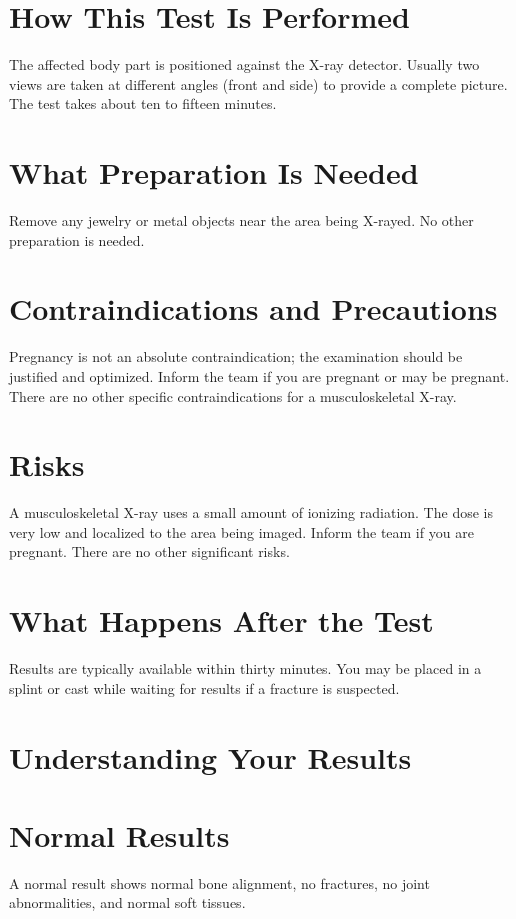 \section*{How This Test Is Performed}
The affected body part is positioned against the X-ray detector. Usually two views are taken at different angles (front and side) to provide a complete picture. The test takes about ten to fifteen minutes.

\section*{What Preparation Is Needed}
Remove any jewelry or metal objects near the area being X-rayed. No other preparation is needed.

\section*{Contraindications and Precautions}
Pregnancy is not an absolute contraindication; the examination should be justified and optimized. Inform the team if you are pregnant or may be pregnant. There are no other specific contraindications for a musculoskeletal X-ray.

\section*{Risks}
A musculoskeletal X-ray uses a small amount of ionizing radiation. The dose is very low and localized to the area being imaged. Inform the team if you are pregnant. There are no other significant risks.

\section*{What Happens After the Test}
Results are typically available within thirty minutes. You may be placed in a splint or cast while waiting for results if a fracture is suspected.

\section*{Understanding Your Results}

\section*{Normal Results}
A normal result shows normal bone alignment, no fractures, no joint abnormalities, and normal soft tissues.
\clearpage
